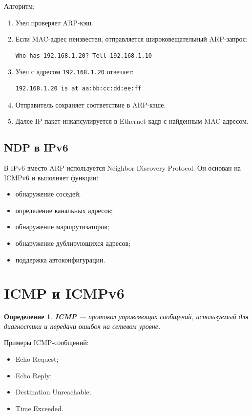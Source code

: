 \documentclass[12pt,a4paper]{article}
\newtheorem{definition}{Определение}
\begin{document}
Алгоритм:

\begin{enumerate}
    \item Узел проверяет ARP-кэш.
    \item Если MAC-адрес неизвестен, отправляется широковещательный ARP-запрос:
\begin{lstlisting}
Who has 192.168.1.20? Tell 192.168.1.10
\end{lstlisting}
    \item Узел с адресом \texttt{192.168.1.20} отвечает:
\begin{lstlisting}
192.168.1.20 is at aa:bb:cc:dd:ee:ff
\end{lstlisting}
    \item Отправитель сохраняет соответствие в ARP-кэше.
    \item Далее IP-пакет инкапсулируется в Ethernet-кадр с найденным MAC-адресом.
\end{enumerate}

\subsection{NDP в IPv6}

В IPv6 вместо ARP используется Neighbor Discovery Protocol. Он основан на ICMPv6 и выполняет функции:

\begin{itemize}
    \item обнаружение соседей;
    \item определение канальных адресов;
    \item обнаружение маршрутизаторов;
    \item обнаружение дублирующихся адресов;
    \item поддержка автоконфигурации.
\end{itemize}

\section{ICMP и ICMPv6}

\begin{definition}
\textbf{ICMP} --- протокол управляющих сообщений, используемый для диагностики и передачи ошибок на сетевом уровне.
\end{definition}

Примеры ICMP-сообщений:

\begin{itemize}
    \item Echo Request;
    \item Echo Reply;
    \item Destination Unreachable;
    \item Time Exceeded.
\end{itemize}
\end{document}
